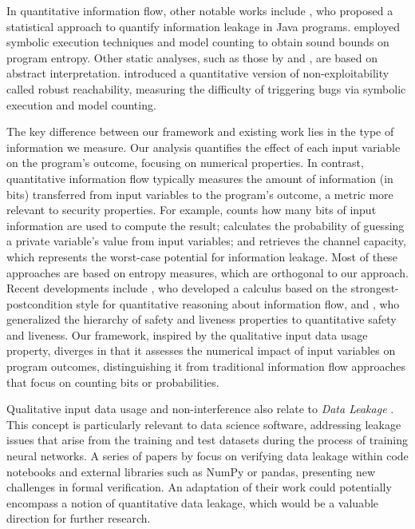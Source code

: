 In quantitative information flow, other notable works include , who proposed a statistical approach to quantify information leakage in Java programs.
 employed symbolic execution techniques and model counting to obtain sound bounds on program entropy.
Other static analyses, such as those by  and , are based on abstract interpretation.
 introduced a quantitative version of non-exploitability called robust reachability, measuring the difficulty of triggering bugs via symbolic execution and model counting.

The key difference between our framework and existing work lies in the type of information we measure.
Our analysis quantifies the effect of each input variable on the program's outcome, focusing on numerical properties.
In contrast, quantitative information flow typically measures the amount of information (in bits) transferred from input variables to the program's outcome, a metric more relevant to security properties.
For example,  counts how many bits of input information are used to compute the result;  calculates the probability of guessing a private variable's value from input variables; and  retrieves the channel capacity, which represents the worst-case potential for information leakage.
Most of these approaches are based on entropy measures, which are orthogonal to our approach.
Recent developments include , who developed a calculus based on the strongest-postcondition style for quantitative reasoning about information flow, and , who generalized the hierarchy of safety and liveness properties to quantitative safety and liveness.
Our framework, inspired by the qualitative input data usage property, diverges in that it assesses the numerical impact of input variables on program outcomes, distinguishing it from traditional information flow approaches that focus on counting bits or probabilities.

Qualitative input data usage and non-interference also relate to \textit{Data Leakage} .
This concept is particularly relevant to data science software, addressing leakage issues that arise from the training and test datasets during the process of training neural networks.
A series of papers by  focus on verifying data leakage within code notebooks and external libraries such as NumPy or pandas, presenting new challenges in formal verification.
An adaptation of their work could potentially encompass a notion of quantitative data leakage, which would be a valuable direction for further research.

